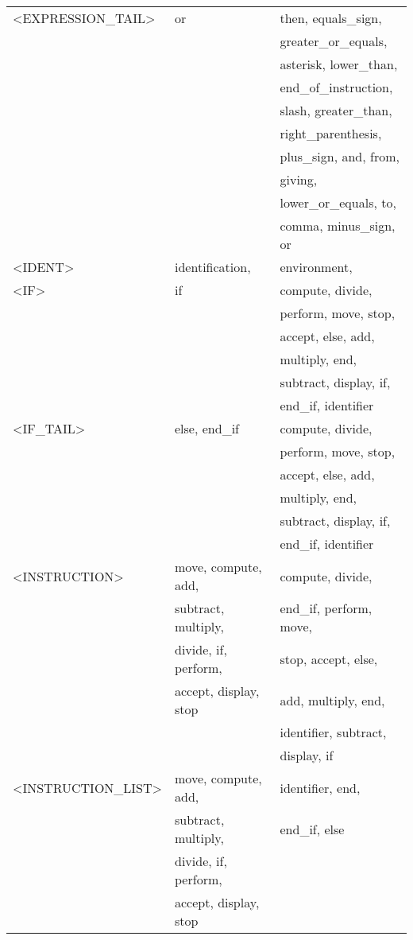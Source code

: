 \begin{longtable}{|l|l|l|}
<EXPRESSION\_TAIL>  &  or &   then, equals\_sign, \\ 
  &  &   greater\_or\_equals, \\ 
  &  &   asterisk, lower\_than, \\ 
  &  &   end\_of\_instruction, \\ 
  &  &   slash, greater\_than, \\ 
  &  &   right\_parenthesis, \\ 
  &  &   plus\_sign, and, from, \\ 
  &  &   giving, \\ 
  &  &   lower\_or\_equals, to, \\ 
  &  &   comma, minus\_sign, or \\ 
  \hline
<IDENT>  &  identification, &   environment, \\ 
  \hline
<IF>  &  if &   compute, divide, \\ 
  &  &   perform, move, stop, \\ 
  &  &   accept, else, add, \\ 
  &  &   multiply, end, \\ 
  &  &   subtract, display, if, \\ 
  &  &   end\_if, identifier \\ 
  \hline
<IF\_TAIL>  &  else, end\_if &   compute, divide, \\ 
  &  &   perform, move, stop, \\ 
  &  &   accept, else, add, \\ 
  &  &   multiply, end, \\ 
  &  &   subtract, display, if, \\ 
  &  &   end\_if, identifier \\ 
  \hline
<INSTRUCTION>  &  move, compute, add, &   compute, divide, \\ 
  &  subtract, multiply, &   end\_if, perform, move, \\ 
  &  divide, if, perform, &   stop, accept, else, \\ 
  &  accept, display, stop &   add, multiply, end, \\ 
  &  &   identifier, subtract, \\ 
  &  &   display, if \\ 
  \hline
<INSTRUCTION\_LIST>  &  move, compute, add, &   identifier, end, \\ 
  &  subtract, multiply, &   end\_if, else \\ 
  &  divide, if, perform, &   \\ 
  &  accept, display, stop &   \\ 

\end{longtable}
